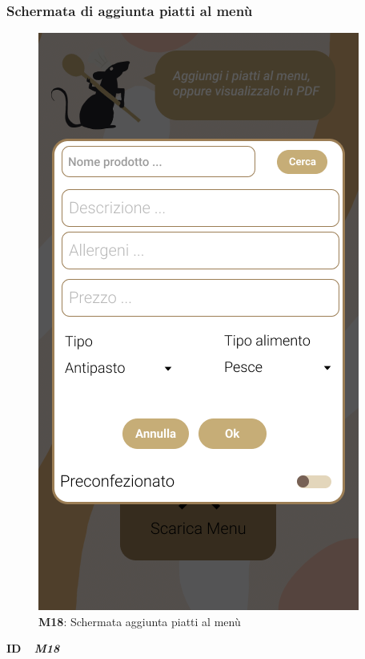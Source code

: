                     \subsubsection{Schermata di aggiunta piatti al menù}
                        \begin{figure}[H]
                          \centering
                          \includegraphics[scale=0.5]{assets/diagrammi/Mockup/Mockup_AddPlate.png}
                          \caption*{\textbf{M18}: Schermata aggiunta piatti al menù}\label{fig:Mockup_AddPlate}
                        \end{figure}
              
                        \begin{flushleft}
                          \textbf{ID}   \ \Large{ \emph{\textbf{M18}}}
                        \end{flushleft}
              

